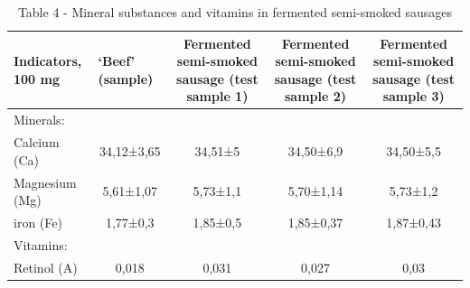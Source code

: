 \begin{table}[H]
\caption*{Table 4 - Mineral substances and vitamins in fermented semi-smoked sausages}
\centering
\begin{tabular}{|lcccc|}
\hline
\multicolumn{1}{|l|}{Indicators, 100 mg}      & \multicolumn{1}{l|}{‘Beef’ (sample)} & \multicolumn{1}{p{0.15\textwidth}|}{Fermented semi-smoked sausage (test sample 1)} & \multicolumn{1}{p{0.15\textwidth}|}{Fermented semi-smoked sausage (test sample 2)} & \multicolumn{1}{p{0.15\textwidth}|}{Fermented semi-smoked sausage (test sample 3)} \\ \hline
\multicolumn{5}{|l|}{Minerals:}                                                                                                                                                                                                                                                                     \\ \hline
\multicolumn{1}{|l|}{Calcium (Ca)}            & \multicolumn{1}{c|}{34,12±3,65}      & \multicolumn{1}{c|}{34,51±5}                                       & \multicolumn{1}{c|}{34,50±6,9}                                     & 34,50±5,5                                                          \\ \hline
\multicolumn{1}{|l|}{Magnesium (Mg)}          & \multicolumn{1}{c|}{5,61±1,07}       & \multicolumn{1}{c|}{5,73±1,1}                                      & \multicolumn{1}{c|}{5,70±1,14}                                     & 5,73±1,2                                                           \\ \hline
\multicolumn{1}{|l|}{iron (Fe)}               & \multicolumn{1}{c|}{1,77±0,3}        & \multicolumn{1}{c|}{1,85±0,5}                                      & \multicolumn{1}{c|}{1,85±0,37}                                     & 1,87±0,43                                                          \\ \hline
\multicolumn{5}{|l|}{Vitamins:}                                                                                                                                                                                                                                                                     \\ \hline
\multicolumn{1}{|l|}{Retinol (A)}             & \multicolumn{1}{c|}{0,018}           & \multicolumn{1}{c|}{0,031}                                         & \multicolumn{1}{c|}{0,027}                                         & 0,03                                                               \\ \hline

\end{tabular}
\end{table}
